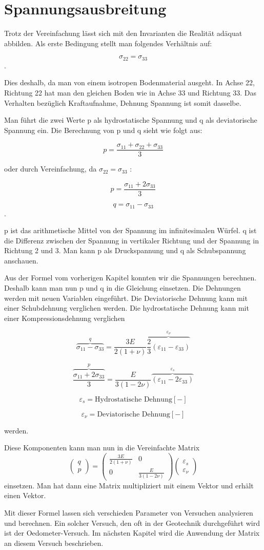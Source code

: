 \section{Spannungsausbreitung\label{spannung:section:Invarianten}}
Trotz der Vereinfachung lässt sich mit den Invarianten die Realität adäquat abbilden.
Als erste Bedingung stellt man folgendes Verhältnis auf:

\[
\sigma_{22}
=
\sigma_{33}
\]
.

Dies deshalb, da man von einem isotropen Bodenmaterial ausgeht.
In Achse 22, Richtung 22 hat man den gleichen Boden wie in Achse 33 und Richtung 33.
Das Verhalten bezüglich Kraftaufnahme, Dehnung Spannung ist somit dasselbe.

Man führt die zwei Werte p als hydrostatische Spannung und q als deviatorische Spannung ein.
Die Berechnung von p und q sieht wie folgt aus:

\[
p
=
\frac{\sigma_{11}+\sigma_{22}+\sigma_{33}}{3}
\]

oder durch Vereinfachung, da $\sigma_{22}=\sigma_{33}$ :

\[
p
=
\frac{\sigma_{11}+2\sigma_{33}}{3}
\]

\[
q
=
\sigma_{11}-\sigma_{33}
\]
.

p ist das arithmetische Mittel von der Spannung im infinitesimalen Würfel.
q ist die Differenz zwischen der Spannung in vertikaler Richtung und der Spannung in Richtung 2 und 3.
Man kann p als Druckspannung und q als Schubspannung anschauen.

Aus der Formel vom vorherigen Kapitel konnten wir die Spannungen berechnen.
Deshalb kann man nun p und q in die Gleichung einsetzen.
Die Dehnungen werden mit neuen Variablen eingeführt.
Die Deviatorische Dehnung kann mit einer Schubdehnung verglichen werden.
Die hydrostatische Dehnung kann mit einer Kompressionsdehnung verglichen

\[
\overbrace{\sigma_{11}-\sigma_{33}}^{q}
=
\frac{3E}{2(1+\nu)} \overbrace{\frac{2}{3}(\varepsilon_{11} - \varepsilon_{33})}^{\varepsilon_{\nu}}
\]

\[
\overbrace{\frac{\sigma_{11}+2\sigma_{33}}{3}}^{p}
=
\frac{E}{3(1-2\nu)} \overbrace{(\varepsilon_{11} - 2\varepsilon_{33})}^{\varepsilon_{s}}
\]

\[
\varepsilon_{s}
=
\text{Hydrostatische Dehnung} [-]
\]

\[
\varepsilon_{\nu}
=
\text{Deviatorische Dehnung} [-]
\]

werden.

Diese Komponenten kann man nun in die Vereinfachte Matrix
\[
\begin{pmatrix}
	q\\
	p
\end{pmatrix}
=
\begin{pmatrix}
	\frac{3E}{2(1+\nu)} &                   0 \\
	                  0 & \frac{E}{3(1-2\nu)}
\end{pmatrix}
\begin{pmatrix}
	\varepsilon_{s}\\
	\varepsilon_{\nu}
\end{pmatrix}
\]
einsetzen.
Man hat dann eine Matrix multipliziert mit einem Vektor und erhält einen Vektor.

Mit dieser Formel lassen sich verschieden Parameter von Versuchen analysieren und berechnen.
Ein solcher Versuch, den oft in der Geotechnik durchgeführt wird ist der Oedometer-Versuch.
Im nächsten Kapitel wird die Anwendung der Matrix an diesem Versuch beschrieben.